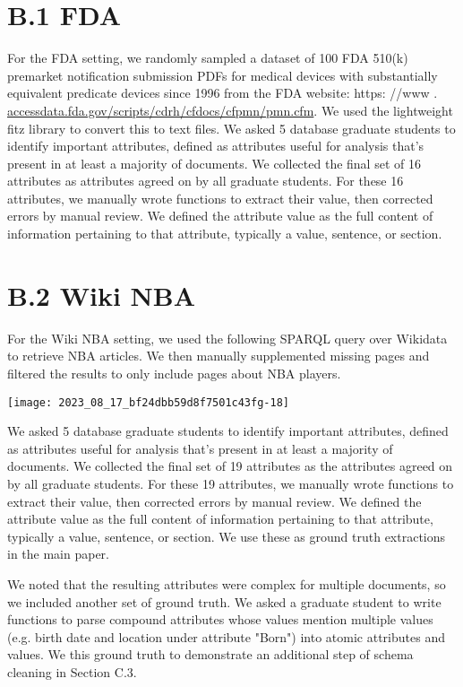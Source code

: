 \documentclass[10pt]{article}
\begin{document}
\section{B.1 FDA}
For the FDA setting, we randomly sampled a dataset of 100 FDA 510(k) premarket notification submission PDFs for medical devices with substantially equivalent predicate devices since 1996 from the FDA website: https: //www . \href{http://accessdata.fda.gov/scripts/cdrh/cfdocs/cfpmn/pmn.cfm}{accessdata.fda.gov/scripts/cdrh/cfdocs/cfpmn/pmn.cfm}. We used the lightweight fitz library to convert this to text files. We asked 5 database graduate students to identify important attributes, defined as attributes useful for analysis that's present in at least a majority of documents. We collected the final set of 16 attributes as attributes agreed on by all graduate students. For these 16 attributes, we manually wrote functions to extract their value, then corrected errors by manual review. We defined the attribute value as the full content of information pertaining to that attribute, typically a value, sentence, or section.

\section{B.2 Wiki NBA}
For the Wiki NBA setting, we used the following SPARQL query over Wikidata to retrieve NBA articles. We then manually supplemented missing pages and filtered the results to only include pages about NBA players.

\begin{center}
\texttt{[image: 2023\_08\_17\_bf24dbb59d8f7501c43fg-18]}
\end{center}

We asked 5 database graduate students to identify important attributes, defined as attributes useful for analysis that's present in at least a majority of documents. We collected the final set of 19 attributes as the attributes agreed on by all graduate students. For these 19 attributes, we manually wrote functions to extract their value, then corrected errors by manual review. We defined the attribute value as the full content of information pertaining to that attribute, typically a value, sentence, or section. We use these as ground truth extractions in the main paper.

We noted that the resulting attributes were complex for multiple documents, so we included another set of ground truth. We asked a graduate student to write functions to parse compound attributes whose values mention multiple values (e.g. birth date and location under attribute "Born") into atomic attributes and values. We this ground truth to demonstrate an additional step of schema cleaning in Section C.3.
\end{document}

